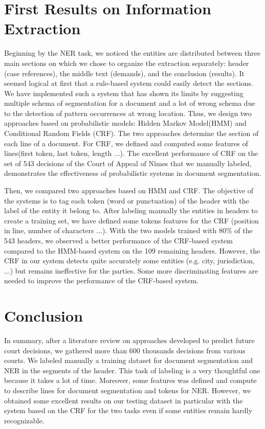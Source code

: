 \documentclass[runningheads,a4paper]{llncs}
\begin{document}
\section{First Results on Information Extraction}

Beginning by the NER task, we noticed the entities are distributed between three main sections on which we chose to organize the extraction separately: header (case references), the middle text (demands), and the conclusion (results). It seemed logical at first that a rule-based system could easily detect the sections. We have implemented such a system that has shown its limits by suggesting multiple schema of segmentation for a document and a lot of wrong schema due to the detection of pattern occurrences at wrong location. Thus, we design two approaches based on probabilistic models: Hidden Markov Model(HMM) and Conditional Random Fields (CRF). The two approaches determine the section of each line of a document. For CRF, we defined and computed some features of lines(first token, last token, length ...). The excellent performance of CRF on the set of 543 decisions of the Court of Appeal of Nîmes that we manually labeled, demonstrates the effectiveness of probabilistic systems in document segmentation.

Then, we compared two approaches based on HMM and CRF. The objective of the systems is to tag each token (word or punctuation) of the header with the label of the entity it belong to. After labeling  manually the entities in headers to create a training set, we have defined some tokens features for the CRF (position in line, number of characters ...). With the two models trained with 80\% of the 543 headers, we observed a better performance of the CRF-based system compared to the HMM-based system on the 109 remaining headers. However, the CRF in our system detects quite accurately some entities (e.g. city, jurisdiction, ...) but remains ineffective for the parties. Some more discriminating features are needed to improve the performance of the CRF-based system.

\section{Conclusion}

In summary, after a literature review on approaches developed to predict future court decisions, we gathered more than 600 thousands decisions from various courts. We labeled manually a training dataset  for document segmentation and NER in the segments of the header. This task of labeling is a very thoughtful one because it takes a lot of time. Moreover, some features was defined and compute to describe lines for document segmentation and tokens for NER. However, we obtained some excellent results on our testing dataset in particular with the system based on the CRF for the two tasks even if some entities remain hardly recognizable.
\end{document}
